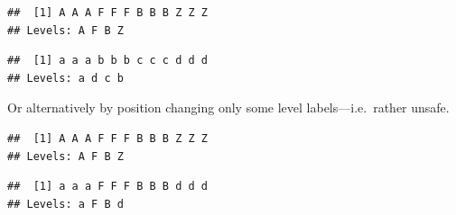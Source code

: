 \documentclass[krantz2]{krantz}\usepackage{knitr}%
\begin{document}
\begin{explainbox}
\begin{knitrout}\footnotesize
{}\color{fgcolor}\begin{kframe}
\begin{alltt}
 \hlkwb{<-} \hlstd{(}\hlstd{,} \hlstd{,}  \hlstd{=} \hlstd{(}\hlstd{,} \hlstd{,} \hlstd{,} \hlstd{))}
\end{alltt}
\begin{verbatim}
##  [1] A A A F F F B B B Z Z Z
## Levels: A F B Z
\end{verbatim}
\begin{alltt}
 \hlkwb{<-} \hlstd{(} \hlstd{=} \hlstd{,}  \hlstd{=} \hlstd{,}  \hlstd{=} \hlstd{,}  \hlstd{=} \hlstd{)}
\end{alltt}
\begin{verbatim}
##  [1] a a a b b b c c c d d d
## Levels: a d c b
\end{verbatim}
\end{kframe}
\end{knitrout}

Or alternatively by position changing only some level labels---i.e.\ rather unsafe.

\begin{knitrout}\footnotesize
{}\color{fgcolor}\begin{kframe}
\begin{alltt}
 \hlkwb{<-} \hlstd{(}\hlstd{,} \hlstd{,}  \hlstd{=} \hlstd{(}\hlstd{,} \hlstd{,} \hlstd{,} \hlstd{))}
\end{alltt}
\begin{verbatim}
##  [1] A A A F F F B B B Z Z Z
## Levels: A F B Z
\end{verbatim}
\begin{alltt}
\hlstd{(my.factor1)[}\hlstd{(}\hlstd{,} \hlstd{)]} \hlkwb{<-} \hlstd{(}\hlstd{,} \hlstd{)}
\end{alltt}
\begin{verbatim}
##  [1] a a a F F F B B B d d d
## Levels: a F B d
\end{verbatim}
\end{kframe}
\end{knitrout}

\end{explainbox}
\end{document}
